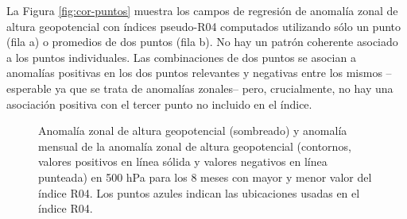 \documentclass[12pt,oneside,a4paper]{reedthesis}
\begin{document}
La Figura \ref{fig:cor-puntos} muestra los campos de regresión de anomalía zonal de altura geopotencial con índices pseudo-R04 computados utilizando sólo un punto (fila a) o promedios de dos puntos (fila b).
No hay un patrón coherente asociado a los puntos individuales.
Las combinaciones de dos puntos se asocian a anomalías positivas en los dos puntos relevantes y negativas entre los mismos --esperable ya que se trata de anomalías zonales-- pero, crucialmente, no hay una asociación positiva con el tercer punto no incluido en el índice.

\begin{figure}

{\centering {}\newline{}

}

\caption{Anomalía zonal de altura geopotencial (sombreado) y anomalía mensual de la anomalía zonal de altura geopotencial (contornos, valores positivos en línea sólida y valores negativos en línea punteada) en 500 hPa para los 8 meses con mayor y menor valor del índice R04. Los puntos azules indican las ubicaciones usadas en el índice R04.}\label{fig:raphael-top8}
\end{figure}
\end{document}
